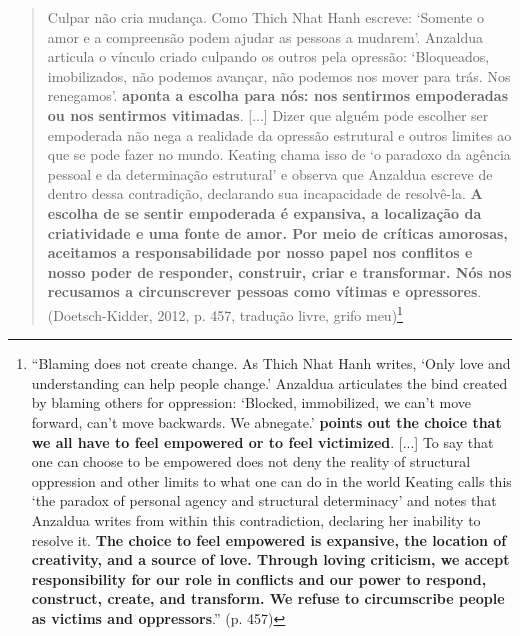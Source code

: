 \begin{quote}
    Culpar não cria mudança. Como Thich Nhat Hanh escreve: ‘Somente o amor e a compreensão podem ajudar as pessoas a mudarem’. Anzaldua articula o vínculo criado culpando os outros pela opressão: ‘Bloqueados, imobilizados, não podemos avançar, não podemos nos mover para trás. Nos renegamos’. \textbf{aponta a escolha para nós: nos sentirmos empoderadas ou nos sentirmos vitimadas}. [...] Dizer que alguém pode escolher ser empoderada não nega a realidade da opressão estrutural e outros limites ao que se pode fazer no mundo. Keating chama isso de ‘o paradoxo da agência pessoal e da determinação estrutural’ e observa que Anzaldua escreve de dentro dessa contradição, declarando sua incapacidade de resolvê-la. \textbf{A escolha de se sentir empoderada é expansiva, a localização da criatividade e uma fonte de amor. Por meio de críticas amorosas, aceitamos a responsabilidade por nosso papel nos conflitos e nosso poder de responder, construir, criar e transformar. Nós nos recusamos a circunscrever pessoas como vítimas e opressores}. (Doetsch-Kidder, 2012, p. 457, tradução livre, grifo meu)\footnote{``Blaming does not create change. As Thich Nhat Hanh writes, ‘Only love and understanding can help people change.’ Anzaldua articulates the bind created by blaming others for oppression: ‘Blocked, immobilized, we can't move forward, can't move backwards. We abnegate.’ \textbf{points out the choice that we all have to feel empowered or to feel victimized}. [...] To say that one can choose to be empowered does not deny the reality of structural oppression and other limits to what one can do in the world Keating calls this ‘the paradox of personal agency and structural determinacy’ and notes that Anzaldua writes from within this contradiction, declaring her inability to resolve it. \textbf{The choice to feel empowered is expansive, the location of creativity, and a source of love. Through loving criticism, we accept responsibility for our role in conflicts and our power to respond, construct, create, and transform. We refuse to circumscribe people as victims and oppressors}.'' (p. 457)}
\end{quote}

